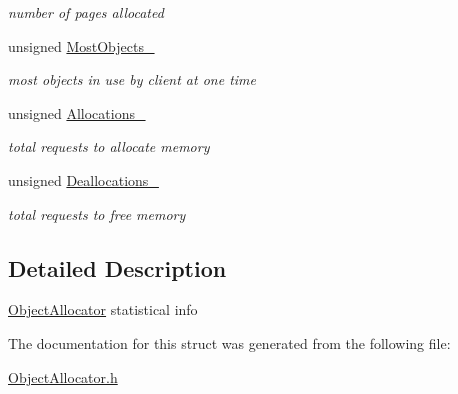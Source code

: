 \begin{DoxyCompactItemize}
\begin{DoxyCompactList}\small\item\em number of pages allocated \end{DoxyCompactList}\item 
\hypertarget{structOAStats_ae4c86ba164d10c52d07b64060bd37a4b}{unsigned \hyperlink{structOAStats_ae4c86ba164d10c52d07b64060bd37a4b}{Most\-Objects\-\_\-}}\label{structOAStats_ae4c86ba164d10c52d07b64060bd37a4b}

\begin{DoxyCompactList}\small\item\em most objects in use by client at one time \end{DoxyCompactList}\item 
\hypertarget{structOAStats_af03c3da81212bd689b962e36711a3298}{unsigned \hyperlink{structOAStats_af03c3da81212bd689b962e36711a3298}{Allocations\-\_\-}}\label{structOAStats_af03c3da81212bd689b962e36711a3298}

\begin{DoxyCompactList}\small\item\em total requests to allocate memory \end{DoxyCompactList}\item 
\hypertarget{structOAStats_a1320e1e8baf9a33b5bdf87145f4d4b27}{unsigned \hyperlink{structOAStats_a1320e1e8baf9a33b5bdf87145f4d4b27}{Deallocations\-\_\-}}\label{structOAStats_a1320e1e8baf9a33b5bdf87145f4d4b27}

\begin{DoxyCompactList}\small\item\em total requests to free memory \end{DoxyCompactList}\end{DoxyCompactItemize}


\subsection{Detailed Description}
\hyperlink{classObjectAllocator}{Object\-Allocator} statistical info 

The documentation for this struct was generated from the following file\-:\begin{DoxyCompactItemize}
\item 
\hyperlink{ObjectAllocator_8h}{Object\-Allocator.\-h}\end{DoxyCompactItemize}
